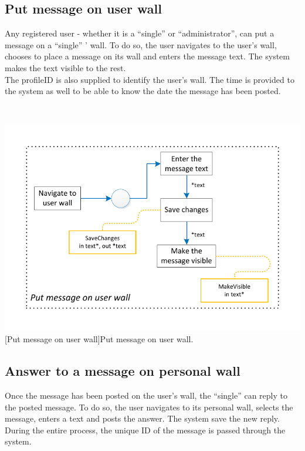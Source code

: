 \documentclass[11pt, a4paper,svglistings,oneside]{book}
\begin{document}
\subsection{Put message on user wall}

Any registered user - whether it is a ``single'' or ``administrator'', can put a message on a ``single'' ' wall. To do so, the user navigates to the user's wall, chooses to place a message on its wall and enters the message text. The system makes the text visible to the rest. \\
The profileID is also supplied to identify the user's wall. The time is provided to the system as well to be able to know the date the message has been posted.

$\;$ \\
\noindent\begin{minipage}{\textwidth}
    \centering
   \includegraphics[scale=1]{nav_PutMessageOnUserWall.pdf}
 [Put message on user wall]{Put message on user wall.}
\end{minipage}

\subsection{Answer to a message on personal wall}

Once the message has been posted on the user's wall, the ``single'' can reply to the posted message. To do so, the user navigates to its personal wall, selects the message, enters a text and posts the answer. The system save the new reply. During the entire process, the unique ID of the message is passed through the system. 
\end{document}
